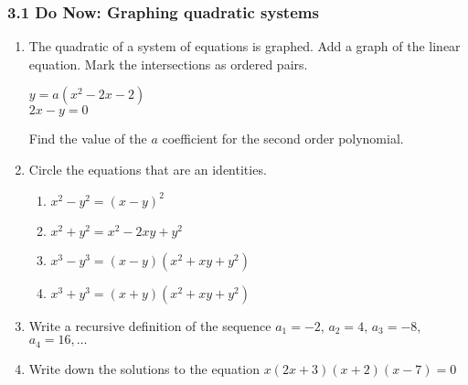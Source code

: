 \documentclass[12pt, twoside]{article}
\begin{document}
\subsubsection*{3.1 Do Now: Graphing quadratic systems}
\begin{enumerate}
  \item The quadratic of a system of equations is graphed. Add a graph of the linear equation. Mark the intersections as ordered pairs.

  \begin{multicols}{2}
    $y = a(x^2 - 2x - 2)$ \\
    \columnbreak
    $2x-y = 0$
    \end{multicols}
    Find the value of the $a$ coefficient for the second order polynomial. \vspace{2cm}

  \begin{center}
  \end{center}

\newpage
\item Circle the equations that are an identities.
    \begin{multicols}{2}
      \begin{enumerate}
        \item \(x^2 - y^2 = (x - y)^2\)
        \item \(x^2 + y^2 = x^2 - 2xy + y^2\)
        \item \(x^3 - y^3 = (x - y)(x^2 + xy + y^2)\)
        \item \(x^3 + y^3 = (x + y)(x^2 + xy + y^2)\)
      \end{enumerate}
    \end{multicols}

\item Write a recursive definition of the sequence $a_1 = -2$, $a_2 = 4$, $a_3 = -8$, $a_4 = 16, \ldots$ \vspace{2cm}
    
\item Write down the solutions to the equation $x(2x+3)(x +2)(x - 7) = 0$ \vspace{2cm} 


\end{enumerate}
\end{document}
